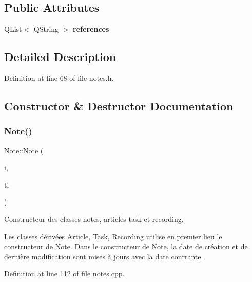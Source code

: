 \subsection*{Public Attributes}
\begin{DoxyCompactItemize}
\item 
\mbox{\label{class_note_ad8918cd74c86c9e00d72cb1a6a5a0f88}} 
Q\+List$<$ Q\+String $>$ {\bfseries references}
\end{DoxyCompactItemize}


\subsection{Detailed Description}


Definition at line 68 of file notes.\+h.



\subsection{Constructor \& Destructor Documentation}
\mbox{\label{class_note_a0490153115307d5f59974d7000260e48}} 
\subsubsection{\texorpdfstring{Note()}{Note()}\hspace{0.1cm}{\footnotesize\ttfamily [1/2]}}
{\footnotesize\ttfamily Note\+::\+Note (\begin{DoxyParamCaption}\item[{const Q\+String \&}]{i,  }\item[{const Q\+String \&}]{ti }\end{DoxyParamCaption})}



Constructeur des classes notes, articles task et recording. 

Les classes dérivées \hyperlink{class_article}{Article}, \hyperlink{class_task}{Task}, \hyperlink{class_recording}{Recording} utilise en premier lieu le constructeur de \hyperlink{class_note}{Note}. Dans le constructeur de \hyperlink{class_note}{Note}, la date de création et de dernière modification sont mises à jours avec la date courrante. 

Definition at line 112 of file notes.\+cpp.

\mbox{\label{class_note_ac06fd282c05bbfe2e1675fe0677b2efb}} 
